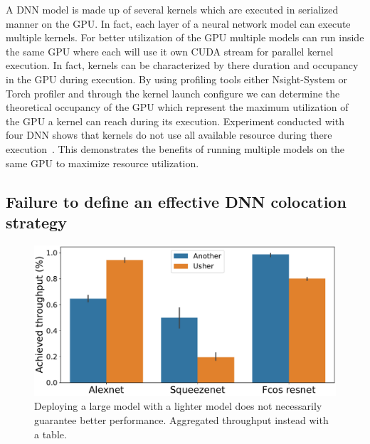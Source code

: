A DNN model is made up of several kernels which are executed in serialized manner on the GPU. In fact, each layer of a neural network model can execute multiple kernels. For better utilization of the GPU multiple models can run inside the same GPU where each will use it own CUDA stream for parallel kernel execution. In fact, kernels can be characterized by there duration and occupancy in the GPU during execution. By using profiling tools either Nsight-System or Torch profiler and through the kernel launch configure we can determine the theoretical occupancy of the GPU which represent the maximum utilization of the GPU a kernel can reach during its execution. Experiment conducted with four DNN shows that kernels do not use all available resource during there execution~. This demonstrates the benefits of running multiple models on the same GPU to maximize resource utilization.


\subsection{Failure to define an effective DNN colocation strategy}

\begin{figure}[t!]
	\centering
	\includegraphics[width=\linewidth]{chapters/roomie/images/aggregate_performance_drop_model.pdf}
	\caption{Deploying a large model with a lighter model does not necessarily guarantee better performance. Aggregated throughput instead with a table.}
	\label{fig:performance_drop_model}
\end{figure}

